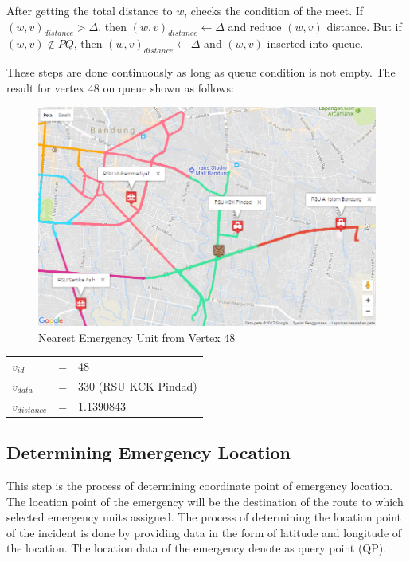 After getting the total distance to $w$, checks the condition of the meet. If $(w, v)_{distance} > \Delta$, then $(w, v)_{distance} \gets \Delta$ and reduce $(w, v)$ distance. But if $(w, v) \notin PQ$, then $(w, v)_{distance} \gets \Delta $ and $(w, v)$ inserted into queue.

\pagebreak
These steps are done continuously as long as queue condition is not empty. The result for vertex 48 on queue shown as follows:

\begin{figure}[H]
    \centering
    \includegraphics[scale=0.55]{data_proc_nvd_construction_2.png}
    \caption{Nearest Emergency Unit from Vertex 48}
    \label{fig:nn_vertex_48}
\end{figure}

\begin{table}[H]
\centering
\begin{tabular}{lll}
$v_{id}$       & = & 48                   \\
$v_{data}$     & = & 330 (RSU KCK Pindad) \\
$v_{distance}$ & = & 1.1390843           
\end{tabular}
\end{table}


\subsection{Determining Emergency Location}
This step is the process of determining coordinate point of emergency location. The location point of the emergency  will be the destination of the route to which selected emergency units assigned. The process of determining the location point of the incident is done by providing data in the form of latitude and longitude of the location. The location data of the emergency denote as query point (QP).

